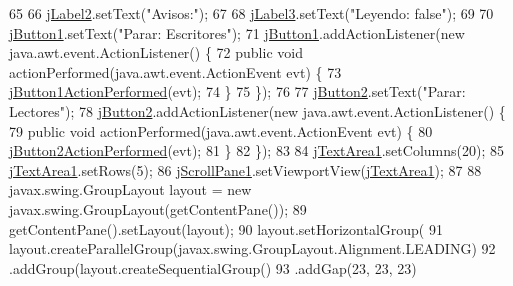 \begin{DoxyCode}
65 
66         \mbox{\hyperlink{classpecl3ignacioriberasemaforos_1_1_libreria_a9362ca0b92689073199ca1afac99fa07}{jLabel2}}.setText(\textcolor{stringliteral}{"Avisos:"});
67 
68         \mbox{\hyperlink{classpecl3ignacioriberasemaforos_1_1_libreria_a8e5cccc84e9e79697bd6a0e06d1f5bcc}{jLabel3}}.setText(\textcolor{stringliteral}{"Leyendo: false"});
69 
70         \mbox{\hyperlink{classpecl3ignacioriberasemaforos_1_1_libreria_ae9afe865b26a1ef3fc5a8a9dbedfc319}{jButton1}}.setText(\textcolor{stringliteral}{"Parar: Escritores"});
71         \mbox{\hyperlink{classpecl3ignacioriberasemaforos_1_1_libreria_ae9afe865b26a1ef3fc5a8a9dbedfc319}{jButton1}}.addActionListener(\textcolor{keyword}{new} java.awt.event.ActionListener() \{
72             \textcolor{keyword}{public} \textcolor{keywordtype}{void} actionPerformed(java.awt.event.ActionEvent evt) \{
73                 \mbox{\hyperlink{classpecl3ignacioriberasemaforos_1_1_libreria_a8a4a4d88e57496a963d12a4b9bccff9b}{jButton1ActionPerformed}}(evt);
74             \}
75         \});
76 
77         \mbox{\hyperlink{classpecl3ignacioriberasemaforos_1_1_libreria_ac544c8592612a783615a2d8e7f58e4db}{jButton2}}.setText(\textcolor{stringliteral}{"Parar: Lectores"});
78         \mbox{\hyperlink{classpecl3ignacioriberasemaforos_1_1_libreria_ac544c8592612a783615a2d8e7f58e4db}{jButton2}}.addActionListener(\textcolor{keyword}{new} java.awt.event.ActionListener() \{
79             \textcolor{keyword}{public} \textcolor{keywordtype}{void} actionPerformed(java.awt.event.ActionEvent evt) \{
80                 \mbox{\hyperlink{classpecl3ignacioriberasemaforos_1_1_libreria_a1e264ca2fc8e02695c41a3adac3db644}{jButton2ActionPerformed}}(evt);
81             \}
82         \});
83 
84         \mbox{\hyperlink{classpecl3ignacioriberasemaforos_1_1_libreria_a6edf2e9a5b9f87fa2d5e0f94ef29a887}{jTextArea1}}.setColumns(20);
85         \mbox{\hyperlink{classpecl3ignacioriberasemaforos_1_1_libreria_a6edf2e9a5b9f87fa2d5e0f94ef29a887}{jTextArea1}}.setRows(5);
86         \mbox{\hyperlink{classpecl3ignacioriberasemaforos_1_1_libreria_a0b0a7cf10b835445e40913dff41cd78d}{jScrollPane1}}.setViewportView(\mbox{\hyperlink{classpecl3ignacioriberasemaforos_1_1_libreria_a6edf2e9a5b9f87fa2d5e0f94ef29a887}{jTextArea1}});
87 
88         javax.swing.GroupLayout layout = \textcolor{keyword}{new} javax.swing.GroupLayout(getContentPane());
89         getContentPane().setLayout(layout);
90         layout.setHorizontalGroup(
91             layout.createParallelGroup(javax.swing.GroupLayout.Alignment.LEADING)
92             .addGroup(layout.createSequentialGroup()
93                 .addGap(23, 23, 23)

\end{DoxyCode}
